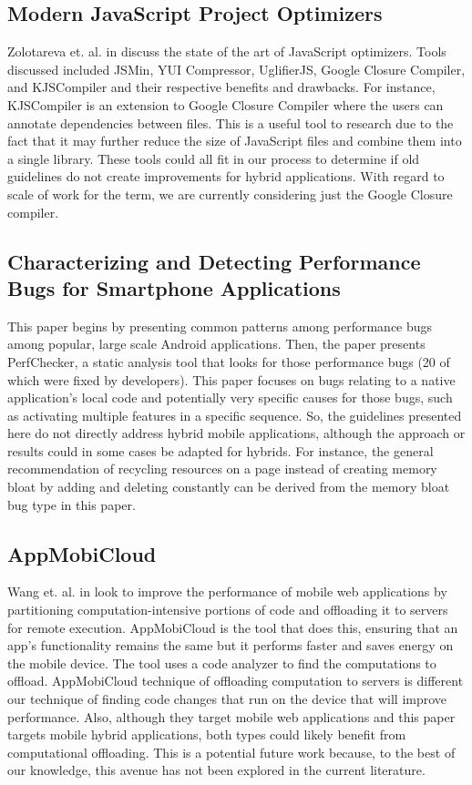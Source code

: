 \documentclass{acm_proc_article-sp}
\begin{document}
\subsection{Modern JavaScript Project Optimizers \cite{zolotareva2014modern}}
Zolotareva et. al. in \cite{zolotareva2014modern} discuss the state of the art of JavaScript optimizers.
Tools discussed included JSMin, YUI Compressor, UglifierJS, Google Closure Compiler, and KJSCompiler and their respective benefits and drawbacks.
For instance, KJSCompiler is an extension to Google Closure Compiler where the users can annotate dependencies between files.
This is a useful tool to research due to the fact that it may further reduce the size of JavaScript files and combine them into a single library.
These tools could all fit in our process to determine if old guidelines do not create improvements for hybrid applications.
With regard to scale of work for the term, we are currently considering just the Google Closure compiler.

\subsection{Characterizing and Detecting Performance Bugs for Smartphone Applications \cite{liu2014characterizing} }
This paper begins by presenting common patterns among performance bugs among popular, large scale Android applications.
Then, the paper presents PerfChecker, a static analysis tool that looks for those performance bugs (20 of which were fixed by developers).
This paper focuses on bugs relating to a native application’s local code and potentially very specific causes for those bugs, such as activating multiple features in a specific sequence.
So, the guidelines presented here do not directly address hybrid mobile applications, although the approach or results could in some cases be adapted for hybrids.
For instance, the general recommendation of recycling resources on a page instead of creating memory bloat by adding and deleting constantly can be derived from the memory bloat bug type in this paper.

\subsection{AppMobiCloud \cite{Wang:2013:AIM:2532443.2532445}}
Wang et. al. in \cite{Wang:2013:AIM:2532443.2532445} look to improve the performance of mobile web applications by partitioning computation-intensive portions of code and offloading it to servers for remote execution. 
AppMobiCloud is the tool that does this, ensuring that an app's functionality remains the same but it performs faster and saves energy on the mobile device.
The tool uses a code analyzer to find the computations to offload. 
AppMobiCloud technique of offloading computation to servers is different our technique of finding code changes that run on the device that will improve performance.
Also, although they target mobile web applications and this paper targets mobile hybrid applications, both types could likely benefit from computational offloading.
This is a potential future work because, to the best of our knowledge, this avenue has not been explored in the current literature.
\end{document}

